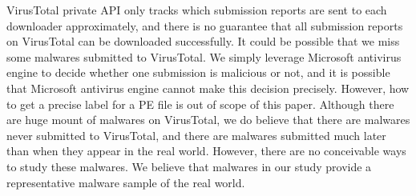 VirusTotal private API only tracks which submission reports are sent to each downloader approximately, 
and there is no guarantee that all submission reports on VirusTotal can be downloaded successfully. 
It could be possible that we miss some malwares submitted to VirusTotal. 
We simply leverage Microsoft antivirus engine to decide whether one submission is malicious or not, 
and it is possible that Microsoft antivirus engine cannot make this decision precisely. 
However, how to get a precise label for a PE file is out of scope of this paper.  
Although there are huge mount of malwares on VirusTotal, we do believe that there are malwares never submitted to VirusTotal, 
and there are malwares submitted much later than when they appear in the real world.
However, there are no conceivable ways to study these malwares. 
We believe that malwares in our study provide a representative malware sample of the real world. 










